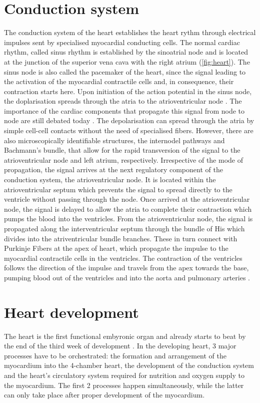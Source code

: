 \section{Conduction system}
The conduction system of the heart establishes the heart rythm through electrical impulses sent by specialised myocardial conducting cells. The normal cardiac rhythm, called sinus rhythm is established by the sinoatrial node and is located at the junction of the superior vena cava with the right atrium (\cref{fig:heart}). The sinus node is also called the pacemaker of the heart, since the signal leading to the activation of the myocardial contractile cells and, in consequence, their contraction starts here. Upon initiation of the action potential in the sinus node, the doplarisation spreads through the atria to the atrioventricular node . The importance of the cardiac components that propagate this signal from node to node are still debated today \citep{Iaizzo2005,Anderson2009}. The depolarisation can spread through the atria by simple cell-cell contacts without the need of specialised fibers. However, there are also microscopically identifiable structures, the internodel pathways and Bachmann's bundle, that allow for the rapid transversion of the signal to the atrioventricular node and left atrium, respectively. Irrespective of the mode of propagation, the signal arrives at the next regulatory component of the conduction system, the atrioventricular node. It is located within the atrioventricular septum which prevents the signal to spread directly to the ventricle without passing through the node. Once arrived at the atrioventricular node, the signal is delayed to allow the atria to complete their contraction which pumps the blood into the ventricles. From the atrioventricular node, the signal is propagated along the interventricular septum through the bundle of His which divides into the atriventricular bundle branches. These in turn connect with Purkinje Fibers at the apex of heart, which propagate the impulse to the myocardial contractile cells in the ventricles. The contraction of the ventricles follows the direction of the impulse and travels from the apex towards the base, pumping blood out of the ventricles and into the aorta and pulmonary arteries \citep{Iaizzo2005,Sigg2010}.  

\section{Heart development}
\label{section:heart-development}
The heart is the first functional embyronic organ and already starts to beat by the end of the third week of development \citep{Zambrano2002}. In the developing heart, \num{3} major processes have to be orchestrated: the formation and arrangement of the myocardium into the \num{4}-chamber heart, the development of the conduction system and the heart's circulatory system required for nutrition and oxygen supply to the myocardium. The first \num{2} processes happen simultaneously, while the latter can only take place after proper development of the myocardium. 


